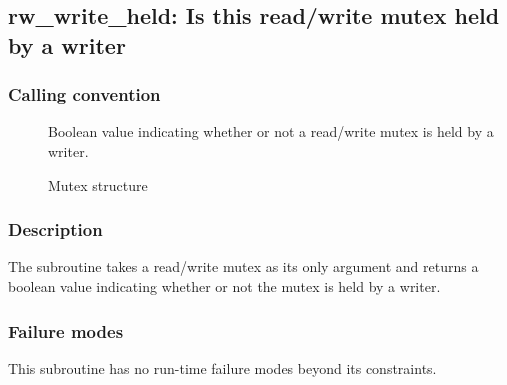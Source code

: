 \clearpage
{}
{}
\label{subr:rw-write-held}
\subsection*{rw\_write\_held: Is this read/write mutex held by a writer}

\subsubsection*{Calling convention}

\begin{description}
\item[] Boolean value indicating whether or not a
  read/write mutex is held by a writer.
\item[] Mutex structure
\end{description}

\subsubsection*{Description}

The  subroutine takes a read/write mutex as
its only argument and returns a boolean value indicating whether or
not the mutex is held by a writer.

\subsubsection*{Failure modes}

This subroutine has no run-time failure modes beyond its constraints.
